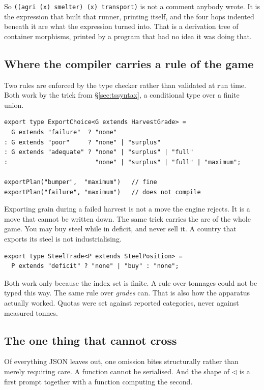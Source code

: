 \documentclass[11pt,a4paper]{article}
\begin{document}
So \texttt{((agri (x) smelter) (x) transport)} is not a comment anybody wrote. It is the expression
that built that runner, printing itself, and the four hops indented beneath it are what the
expression turned into. That is a derivation tree of container morphisms, printed by a program that
had no idea it was doing that.

\subsection{Where the compiler carries a rule of the game}

Two rules are enforced by the type checker rather than validated at run time. Both work by the
trick from §\ref{sec:tssyntax}, a conditional type over a finite union.

\begin{lstlisting}[language=TS]
export type ExportChoice<G extends HarvestGrade> =
  G extends "failure"  ? "none"
: G extends "poor"     ? "none" | "surplus"
: G extends "adequate" ? "none" | "surplus" | "full"
:                        "none" | "surplus" | "full" | "maximum";

exportPlan("bumper",  "maximum")   // fine
exportPlan("failure", "maximum")   // does not compile
\end{lstlisting}

Exporting grain during a failed harvest is not a move the engine rejects. It is a move that
cannot be written down. The same trick carries the arc of the whole game. You may buy steel while
in deficit, and never sell it. A country that exports its steel is not industrialising.

\begin{lstlisting}[language=TS]
export type SteelTrade<P extends SteelPosition> =
  P extends "deficit" ? "none" | "buy" : "none";
\end{lstlisting}

Both work only because the index set is finite. A rule over tonnages could not be typed this way.
The same rule over \emph{grades} can. That is also how the apparatus actually worked. Quotas were
set against reported categories, never against measured tonnes.

\subsection{The one thing that cannot cross}

Of everything JSON leaves out, one omission bites structurally rather than merely requiring care.
A function cannot be serialised. And the shape of $\lhd$ is a first prompt together with a function
computing the second.
\end{document}
